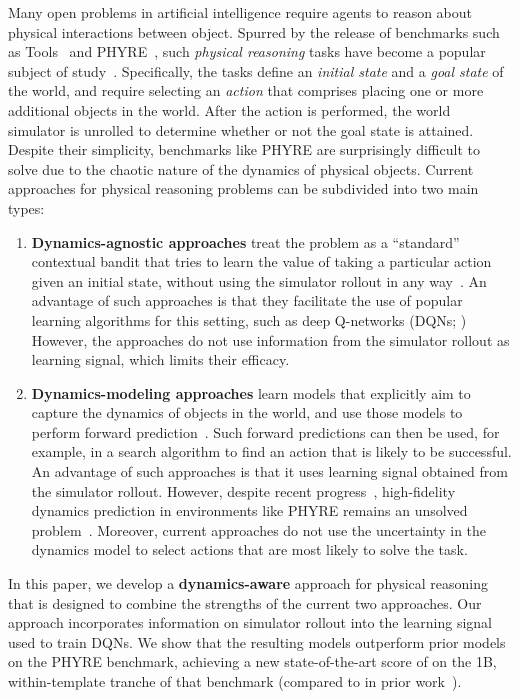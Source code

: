\documentclass{article}
\begin{document}
Many open problems in artificial intelligence require agents to reason about physical interactions between object.
Spurred by the release of benchmarks such as Tools~\cite{allen2019tools} and PHYRE~\cite{bakhtin2019phyre}, such \emph{physical reasoning} tasks have become a popular subject of study~\cite{girdhar2020forward,qi2020longterm,Whitney2020DynamicsawareE}.
Specifically, the tasks define an \emph{initial state} and a \emph{goal state} of the world, and require selecting an \emph{action} that comprises placing one or more additional objects in the world.
After the action is performed, the world simulator is unrolled to determine whether or not the goal state is attained.
Despite their simplicity, benchmarks like PHYRE are surprisingly difficult to solve due to the chaotic nature of the dynamics of physical objects. 
Current approaches for physical reasoning problems can be subdivided into two main types:
\begin{enumerate}[leftmargin=*]
\item \textbf{Dynamics-agnostic approaches} treat the problem as a ``standard'' contextual bandit that tries to learn the value of taking a particular action given an initial state, without using the simulator rollout in any way~\cite{bakhtin2019phyre}. 
An advantage of such approaches is that they facilitate the use of popular learning algorithms for this setting, such as deep Q-networks (DQNs; \cite{mnih-atari-2013}) 
However, the approaches do not use information from the simulator rollout as learning signal, which limits their efficacy.
\item \textbf{Dynamics-modeling approaches} learn models that explicitly aim to capture the dynamics of objects in the world, and use those models to perform forward prediction~\cite{girdhar2020forward,qi2020longterm,Whitney2020DynamicsawareE}.
Such forward predictions can then be used, for example, in a search algorithm to find an action that is likely to be successful.
An advantage of such approaches is that it uses learning signal obtained from the simulator rollout.
However, despite recent progress~\cite{gonzalez2020learning}, high-fidelity dynamics prediction in environments like PHYRE remains an unsolved problem~\cite{girdhar2020forward}.
Moreover, current approaches do not use the uncertainty in the dynamics model to select actions that are most likely to solve the task.
\end{enumerate}
In this paper, we develop a \textbf{dynamics-aware} approach for physical reasoning that is designed to combine the strengths of the current two approaches.
Our approach incorporates information on simulator rollout into the learning signal used to train DQNs.
We show that the resulting models outperform prior models on the PHYRE benchmark, achieving a new state-of-the-art score of  on the 1B, within-template tranche of that benchmark (compared to  in prior work~\cite{girdhar2020forward}).
\end{document}
